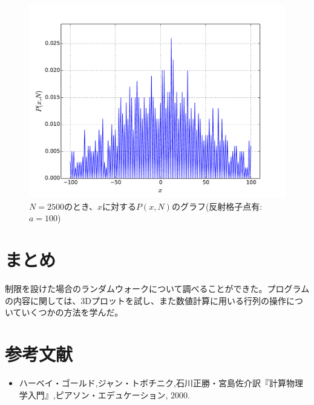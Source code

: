 \documentclass{jsarticle}
\begin{document}
\begin{enumerate}
\begin{enumerate}
                    \begin{figure}[H]
                        \begin{center}
                        \includegraphics[width=12.5cm]{figure_7.pdf}
                        \caption{$N=2500$のとき、$x$に対する$P(x,N)$のグラフ(反射格子点有:$a=100$)}
                        \label{fig:7}
                    \end{center}
                    \end{figure}


                \end{enumerate} 

        \end{enumerate}

    \section{まとめ}

        制限を設けた場合のランダムウォークについて調べることができた。プログラムの内容に関しては、3Dプロットを試し、また数値計算に用いる行列の操作についていくつかの方法を学んだ。


    \section{参考文献}

        \begin{itemize}
            \item ハーベイ・ゴールド,ジャン・トボチニク,石川正勝・宮島佐介訳『計算物理学入門』,ピアソン・エデュケーション, 2000.
        \end{itemize}
\end{document}
